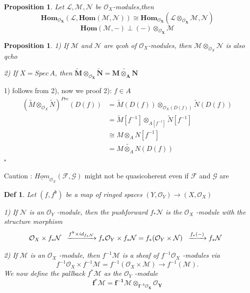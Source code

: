 \documentclass{article}
\newtheorem{definition}[theorem]{Def}
\newtheorem{proposition}[theorem]{Proposition}
\newenvironment{Proof}{{\noindent \indent \it Proof:\quad}}{\hfill $\square$\par}
\begin{document}
\begin{proposition}
    Let $\mathcal L,\mathcal M,\mathcal N$ be $\mathcal O_X$-modules,then  
    $$
    \bm{Hom_{\mathcal O_X}(\mathcal L,\underline{Hom}(\mathcal M,\mathcal N))\cong
    Hom_{\mathcal O_X}(\mathcal L\otimes_{\mathcal O_X}\mathcal M,\mathcal N)}
    $$
$$\bm{\underline{Hom}(\mathcal M,-)\perp
(-)\otimes_{\mathcal O_X}\mathcal M}$$
\end{proposition}

\begin{proposition}
    1) If $\mathcal M$ and $\mathcal N$ are qcoh of $\mathcal O_X$-modules, then $\mathcal M\otimes_{\mathcal O_X}\mathcal N$ is also qcho

    2) If $X=Spec\,A$, then $\bm{\widetilde M\otimes_{\mathcal O_X}\widetilde N=\widetilde {M\otimes_{A}N}}$
    \label{prop 3.69}
\end{proposition}
\begin{Proof}
1) follows from 2), now we proof 2): $f\in A$
    \begin{align*}
\label{sup}
(\widetilde M\otimes_{\mathcal O_X}\widetilde N)^{Pre}(D(f))
&=\widetilde M(D(f))\otimes_{\mathcal O_X(D(f))}\widetilde N(D(f))\\
&=\widetilde M[f^{-1}]\otimes_{A[f^{-1}]}\widetilde N[f^{-1}]\\
&\cong  {M\otimes_{A}N}[f^{-1}]\\
&=\widetilde {M\otimes_{A}N}(D(f))
 \end{align*}
\end{Proof}

Caution : $\underline{Hom}_{\mathcal O_X}(\mathcal F,\mathcal G)$ might not be quasicoherent even if $\mathcal F$ and $\mathcal G$ are

\begin{definition}
Let $(f,f^{\mathfrak b})$ be a map of ringed spaces $(Y,{\mathcal{O}}_{Y})\to(X,{\mathcal{O}}_{X})$ 

1) If $\mathcal N$ is an ${\mathcal{O}}_{Y}$ -module, then the pushforward $f_{\ast}{\mathcal{N}}$ is the ${\mathcal{O}}_{X}$ -module with the structure morphism
$$
{\cal O}_{X}\times f_{\ast}{\cal N}\;\;
\xrightarrow{f^{\mathfrak b}\times id_{f_\ast\mathcal N}}
f_\ast{\cal O}_{Y}\times f_{\ast}{\cal N}
=f_{\ast}({\cal O}_{Y}\times{\cal N})\;\;
\xrightarrow{f_{\ast}(-)}
f_{\ast}{\cal N}\;\; 
$$

2) If $\mathcal{M}$ is an ${\mathcal{O}}_{X}$ -module, then $f^{-1}{\mathcal{M}}$ is a sheaf of $f^{-1}{\mathcal{O}}_{X}$ -modules via
$$
f^{-1}{\mathcal{O}}_{X}\times f^{-1}{\mathcal{M}}=f^{-1}({\mathcal{O}}_{X}\times{\mathcal{M}})\longrightarrow f^{-1}({\mathcal{M}}). 
$$
We now define the pallback $f^{*}{\mathcal{M}}$ as the ${\mathcal{O}}_{Y}$ -module
$$
\bm{f^{\ast}{\mathcal M}=f^{-1}{\mathcal M}\otimes_{f^{-1}\mathcal O_{X}}{\mathcal O}_{Y}} 
$$
\label{def 3.70}
\end{definition}
\end{document}
